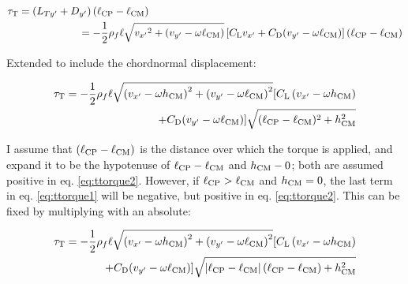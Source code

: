 \documentclass[draft]{jfm} %
\begin{document}
\begin{equation}
\begin{split}
\tau_\textnormal{T} = \left ( L_{Ty'} + D_{y'}\right )\left ( \ell_{\textnormal{CP}}- \ell_{\textnormal{CM}} \right )  \hspace{85mm}\\ 
=-\frac{1}{2}\rho_f\ell \sqrt{{v_{x'}}^2+(v_{y'} - \omega \ell_{\textup{CM}})}\left [ C_{\textnormal{L}}{v_{x'}}+C_{\textnormal{D}}(v_{y'} - \omega \ell_{\textup{CM}}) \right ] \left ( \ell_{\textnormal{CP}}- \ell_{\textnormal{CM}} \right ) 
\end{split}
\label{eq:ttorque1}\end{equation}

Extended to include the chordnormal displacement:

\begin{equation}
\begin{split}
\tau_\textnormal{T} = -\frac{1}{2}\rho_f\ell \sqrt{\left ( {v_{x'}}- \omega h_{\textup{CM}} \right )^2+\left (v_{y'} - \omega \ell_{\textup{CM}}\right)^2} [ C_{\textnormal{L}}\left ( {v_{x'}}- \omega h_{\textup{CM}} \right )  \\ +C_{\textnormal{D}}(v_{y'} - \omega \ell_{\textup{CM}}) ] \sqrt{( \ell_{\textnormal{CP}}- \ell_{\textnormal{CM}} )^2 +h_{\textup{CM}}^2 }
\end{split}
\label{eq:ttorque2}\end{equation}

I assume that $\left ( \ell_{\textnormal{CP}}- \ell_{\textnormal{CM}} \right ) $ is the distance over which the torque is applied, and expand it to be the hypotenuse of $\ell_{\textnormal{CP}}- \ell_{\textnormal{CM}}$ and $h_{\textup{CM}}-0$; both are assumed positive in eq. \ref{eq:ttorque2}. However, if $\ell_{\textnormal{CP}} > \ell_{\textnormal{CM}}$ and $h_{\textnormal{CM}} = 0$, the last term in eq. \ref{eq:ttorque1} will be negative, but positive in eq. \ref{eq:ttorque2}. This can be fixed by multiplying with an absolute:

\begin{equation}
\begin{split}
\tau_\textnormal{T} = -\frac{1}{2}\rho_f\ell \sqrt{\left ( {v_{x'}}- \omega h_{\textup{CM}} \right )^2+\left (v_{y'} - \omega \ell_{\textup{CM}}\right)^2}[ C_{\textnormal{L}}\left ( {v_{x'}}- \omega h_{\textup{CM}} \right )\\+C_{\textnormal{D}}(v_{y'} - \omega \ell_{\textup{CM}})  ]\sqrt{ \left| \ell_{\textnormal{CP}}- \ell_{\textnormal{CM}} \right| (\ell_{\textnormal{CP}}- \ell_{\textnormal{CM}} ) +h_{\textup{CM}}^2 }
\end{split}
\label{eq:ttorque3}\end{equation}
\end{document}

